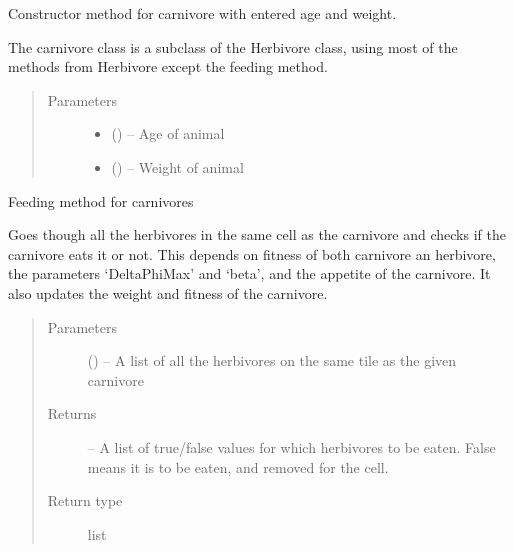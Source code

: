 \documentclass[a4paper,10pt,english]{sphinxmanual}
\begin{document}
\begin{fulllineitems}
\label{\detokenize{animals:biosim.animals.Carnivore}}
Constructor method for carnivore with entered age and weight.

The carnivore class is a subclass of the Herbivore class, using most of
the methods from Herbivore except the feeding method.
\begin{quote}\begin{description}
\item[{Parameters}] \leavevmode\begin{itemize}
\item {} 
 () -- Age of animal

\item {} 
 () -- Weight of animal

\end{itemize}

\end{description}\end{quote}

\begin{fulllineitems}
\label{\detokenize{animals:biosim.animals.Carnivore.feeding}}
Feeding method for carnivores

Goes though all the herbivores in the same cell as the carnivore
and checks if the carnivore eats it or not. This depends on fitness of
both carnivore an herbivore, the parameters `DeltaPhiMax' and `beta',
and the appetite of the carnivore.
It also updates the weight and fitness of the carnivore.
\begin{quote}\begin{description}
\item[{Parameters}] \leavevmode
{} () -- A list of all the herbivores on the same tile as the given carnivore

\item[{Returns}] \leavevmode
{} -- A list of true/false values for which herbivores to be eaten.
False means it is to be eaten, and removed for the cell.

\item[{Return type}] \leavevmode
list

\end{description}\end{quote}

\end{fulllineitems}


\end{fulllineitems}
\end{document}
